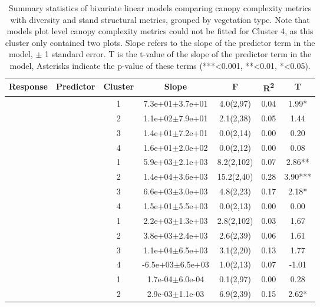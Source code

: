 \begin{longtable}{llccccS[table-format=-2.2, table-space-text-post = {***}]}
\caption{Summary statistics of bivariate linear models comparing canopy complexity metrics with diversity and stand structural metrics, grouped by vegetation type. Note that models plot level canopy complexity metrics could not be fitted for Cluster 4, as this cluster only contained two plots. Slope refers to the slope of the predictor term in the model, $\pm{}$ 1 standard error.  T is the t-value of the slope of the predictor term in the model, Asterisks indicate the p-value of these terms (***<0.001, **<0.01, *<0.05).} \\ 
  \toprule
{Response} & {Predictor} & {Cluster} & {Slope} & {F} & {R\textsuperscript{2}} & {T} \\ 
  \midrule
{} & {} & 1 &  7.3e+01$\pm$3.7e+01 & 4.0(2,97) & 0.04 & 1.99* \\ 
   &  & 2 &  1.1e+02$\pm$7.9e+01 & 2.1(2,38) & 0.05 & 1.44 \\ 
   &  & 3 &  1.4e+01$\pm$7.2e+01 & 0.0(2,14) & 0.00 & 0.20 \\ 
   &  & 4 &  1.6e+01$\pm$2.0e+02 & 0.0(2,12) & 0.00 & 0.08 \\ 
   \midrule
{} & {} & 1 &  5.9e+03$\pm$2.1e+03 & 8.2(2,102) & 0.07 & 2.86** \\ 
   &  & 2 &  1.4e+04$\pm$3.6e+03 & 15.2(2,40) & 0.28 & 3.90*** \\ 
   &  & 3 &  6.6e+03$\pm$3.0e+03 & 4.8(2,23) & 0.17 & 2.18* \\ 
   &  & 4 &  1.5e+01$\pm$5.5e+03 & 0.0(2,13) & 0.00 & 0.00 \\ 
   \midrule
{} & {} & 1 &  2.2e+03$\pm$1.3e+03 & 2.8(2,102) & 0.03 & 1.67 \\ 
   &  & 2 &  3.8e+03$\pm$2.4e+03 & 2.6(2,39) & 0.06 & 1.61 \\ 
   &  & 3 &  1.1e+04$\pm$6.5e+03 & 3.1(2,20) & 0.13 & 1.77 \\ 
   &  & 4 & -6.5e+03$\pm$6.5e+03 & 1.0(2,13) & 0.07 & -1.01 \\ 
   \midrule
{} & {} & 1 &  1.7e-04$\pm$6.0e-04 & 0.1(2,97) & 0.00 & 0.28 \\ 
   &  & 2 &  2.9e-03$\pm$1.1e-03 & 6.9(2,39) & 0.15 & 2.62* \\ 

\end{longtable}
